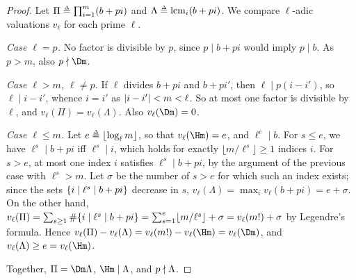 \lemmaLcm*
\begin{proof}
    Let $\Pi \defeq \prod_{i=1}^{m} (b + p i)$ and $\Lambda \defeq \lcm_{i} (b + p i)$. We compare $\ell$-adic valuations $v_{\ell}$ for each prime $\ell$.

    \emph{Case $\ell = p$.} No factor is divisible by $p$, since $p \mid b + p i$ would imply $p \mid b$. As $p > m$, also $p \ndiv \Dm$.

    \emph{Case $\ell > m$, $\ell \ne p$.} If $\ell$ divides $b + p i$ and $b + p i'$, then $\ell \mid p (i - i')$, so $\ell \mid i - i'$, whence $i = i'$ as $\lvert i - i'\rvert < m < \ell$.
    So at most one factor is divisible by $\ell$, and $v_{\ell}(\Pi) = v_{\ell}(\Lambda)$. Also $v_{\ell}(\Dm) = 0$.

    \emph{Case $\ell \le m$.} Let $e \defeq \lfloor \log_{\ell} m \rfloor$, so that $v_{\ell}(\Hm) = e$, and $\ell^{e} \mid b$.
    For $s \le e$, we have $\ell^{s} \mid b + p i$ iff $\ell^{s} \mid i$, which holds for exactly $\lfloor m / \ell^{s} \rfloor \ge 1$ indices $i$.
    For $s > e$, at most one index $i$ satisfies $\ell^{s} \mid b + p i$, by the argument of the previous case with $\ell^{s} > m$.
    Let $\sigma$ be the number of $s > e$ for which such an index exists; since the sets $\{i \mid \ell^{s} \mid b + p i\}$ decrease in $s$, $v_{\ell}(\Lambda) = \max_i v_{\ell}(b + p i) = e + \sigma$.
    On the other hand, $v_{\ell}(\Pi) = \sum_{s \ge 1} \#\{i \mid \ell^{s} \mid b + p i\} = \sum_{s = 1}^{e} \lfloor m / \ell^{s} \rfloor + \sigma = v_{\ell}(m!) + \sigma$ by Legendre's formula.
    Hence $v_{\ell}(\Pi) - v_{\ell}(\Lambda) = v_{\ell}(m!) - v_{\ell}(\Hm) = v_{\ell}(\Dm)$, and $v_{\ell}(\Lambda) \ge e = v_{\ell}(\Hm)$.

    Together, $\Pi = \Dm \Lambda$, $\Hm \mid \Lambda$, and $p \nmid \Lambda$.
\end{proof}
